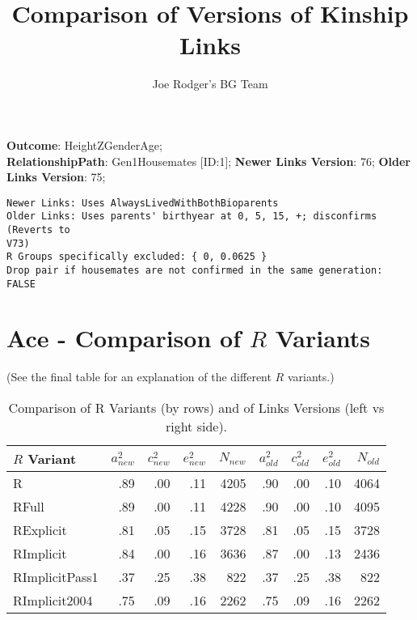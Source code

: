 \documentclass{article}\usepackage[]{graphicx}\usepackage[]{color}
\title{Comparison of Versions of Kinship Links}
\author{Joe Rodger's BG Team}
\makeatletter
\newenvironment{kframe}{%
 \def\at@end@of@kframe{}%
 \ifinner\ifhmode%
  \def\at@end@of@kframe{\end{minipage}}%
  \begin{minipage}{\columnwidth}%
 \fi\fi%
 \def\FrameCommand##1{\hskip\@totalleftmargin \hskip-\fboxsep
 \colorbox{shadecolor}{##1}\hskip-\fboxsep
     \hskip-\linewidth \hskip-\@totalleftmargin \hskip\columnwidth}%
 \MakeFramed {\advance\hsize-\width
   \@totalleftmargin\z@ \linewidth\hsize
   \@setminipage}}%
 {\par\unskip\endMakeFramed%
 \at@end@of@kframe}
\newenvironment{knitrout}{}{} %
\makeatother
\begin{document}
\maketitle
\setcounter{totalnumber}{8} %

\setlength{\parindent}{0pt}%











\textbf{Outcome}: HeightZGenderAge;\\
\textbf{RelationshipPath}: Gen1Housemates [ID:1];
\textbf{Newer Links Version}: 76;
\textbf{Older Links Version}: 75;

\begin{knitrout}
\color{fgcolor}\begin{kframe}
\begin{verbatim}
Newer Links: Uses AlwaysLivedWithBothBioparents
Older Links: Uses parents' birthyear at 0, 5, 15, +; disconfirms (Reverts to
V73)
R Groups specifically excluded: { 0, 0.0625 }
Drop pair if housemates are not confirmed in the same generation: FALSE
\end{verbatim}
\end{kframe}
\end{knitrout}





\section{Ace - Comparison of $R$ Variants} 
(See the final table for an explanation of the different $R$ variants.)
\begin{table}[ht]
\centering
{\large
\begin{tabular}{l|rrrr|rrrr}
  \hline
$R$ Variant & $a_{new}^2$ & $c_{new}^2$ & $e_{new}^2$ & $N_{new}$ & $a_{old}^2$ & $c_{old}^2$ & $e_{old}^2$ & $N_{old}$ \\ 
  \hline
R & .89 & .00 & .11 & 4205 & .90 & .00 & .10 & 4064 \\ 
  RFull & .89 & .00 & .11 & 4228 & .90 & .00 & .10 & 4095 \\ 
  RExplicit & .81 & .05 & .15 & 3728 & .81 & .05 & .15 & 3728 \\ 
  RImplicit & .84 & .00 & .16 & 3636 & .87 & .00 & .13 & 2436 \\ 
  RImplicitPass1 & .37 & .25 & .38 &  822 & .37 & .25 & .38 &  822 \\ 
  RImplicit2004 & .75 & .09 & .16 & 2262 & .75 & .09 & .16 & 2262 \\ 
   \hline
\end{tabular}
}
\caption{Comparison of R Variants (by rows) and of Links Versions (left vs right side).} 
\end{table}
\end{document}
